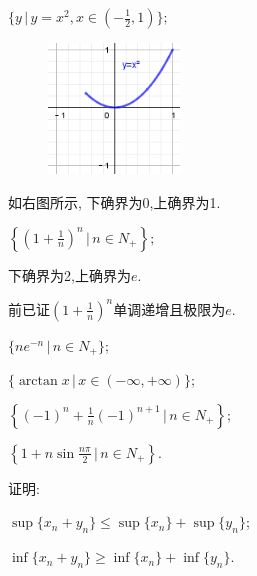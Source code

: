 \documentclass[windows,list,answers]{BHCexam}
\begin{document}
\begin{questions}
\begin{subquestions}
        \subquestion
        $\{y\,\lvert\, y=x^2,x\in(-\frac{1}{2},1)\};$
        \begin{solution}{1cm}
            \methodonly
            \begin{minipage}{\linewidth}
                \begin{figure}
                    \vspace{-2.5cm}
                    \includegraphics[width=3.5cm]{图一.png}
                    \caption{}
                \end{figure}
                如右图所示,
                下确界为0,上确界为1.
            \end{minipage}

        \end{solution}

        \subquestion
        $\left\{\left(1+\frac{1}{n}\right)^n \,\bigg\lvert\, n\in N_+\right\};$
        \begin{solution}{1cm}
            \methodonly
            下确界为2,上确界为$e$.

            前已证$\left(1+\frac{1}{n}\right)^n$单调递增且极限为$e$.
        \end{solution}

        \subquestion
        $\{ne^{-n}\,\lvert\, n\in N_+\};$

        \subquestion
        $\{\arctan x \,\lvert\, x\in (-\infty,+\infty)\};$

        \subquestion
        $\left\{(-1)^n+\frac{1}{n}(-1)^{n+1}\,\biggl\lvert\, n\in N_+\right\};$

        \subquestion
        $\left\{1+n\sin\frac{n\pi}{2}\,\bigg\lvert\, n\in N_+\right\}$.
    \end{subquestions}

    \question
    证明:
    \begin{subquestions}
        \subquestion
        $\sup\{x_n+y_n\}\leqslant \sup\{x_n\}+\sup\{y_n\}$;

        \subquestion
        $\inf\{x_n+y_n\}\geqslant\inf\{x_n\}+\inf\{y_n\}$.
    \end{subquestions}


\end{questions}
\end{document}
